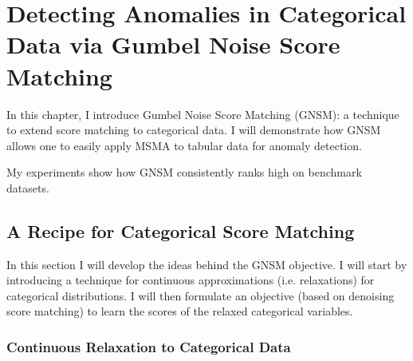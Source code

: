 \chapter{Detecting Anomalies in Categorical Data via Gumbel Noise Score Matching}
\label{ch:gnsm}

In this chapter, I introduce Gumbel Noise Score Matching (GNSM): a technique to extend score matching to categorical data. I will demonstrate how GNSM allows one to easily apply MSMA to tabular data for anomaly detection.

My experiments show how GNSM consistently ranks high on benchmark datasets.





\section{A Recipe for Categorical Score Matching}

In this section I will develop the ideas behind the GNSM objective. I will start by introducing a technique for continuous approximations (i.e. relaxations) for categorical distributions. I will then formulate an objective (based on denoising score matching) to learn the scores of the relaxed categorical variables. 

\subsection*{Continuous Relaxation to Categorical Data}


